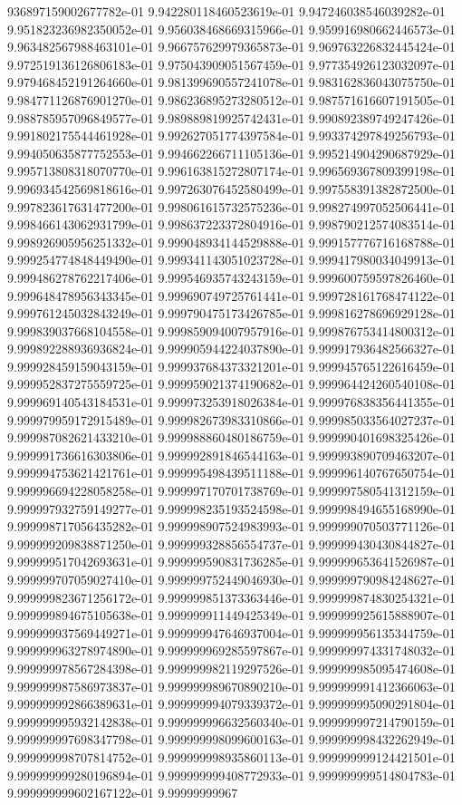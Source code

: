 936897159002677782e-01	9.942280118460523619e-01	9.947246038546039282e-01	9.951823236982350052e-01	9.956038468669315966e-01	9.959916980662446573e-01	9.963482567988463101e-01	9.966757629979365873e-01	9.969763226832445424e-01	9.972519136126806183e-01	9.975043909051567459e-01	9.977354926123032097e-01	9.979468452191264660e-01	9.981399690557241078e-01	9.983162836043075750e-01	9.984771126876901270e-01	9.986236895273280512e-01	9.987571616607191505e-01	9.988785957096849577e-01	9.989889819925742431e-01	9.990892389749247426e-01	9.991802175544461928e-01	9.992627051774397584e-01	9.993374297849256793e-01	9.994050635877752553e-01	9.994662266711105136e-01	9.995214904290687929e-01	9.995713808318070770e-01	9.996163815272807174e-01	9.996569367809399198e-01	9.996934542569818616e-01	9.997263076452580499e-01	9.997558391382872500e-01	9.997823617631477200e-01	9.998061615732575236e-01	9.998274997052506441e-01	9.998466143062931799e-01	9.998637223372804916e-01	9.998790212574083514e-01	9.998926905956251332e-01	9.999048934144529888e-01	9.999157776716168788e-01	9.999254774848449490e-01	9.999341143051023728e-01	9.999417980034049913e-01	9.999486278762217406e-01	9.999546935743243159e-01	9.999600759597826460e-01	9.999648478956343345e-01	9.999690749725761441e-01	9.999728161768474122e-01	9.999761245032843249e-01	9.999790475173426785e-01	9.999816278696929128e-01	9.999839037668104558e-01	9.999859094007957916e-01	9.999876753414800312e-01	9.999892288936936824e-01	9.999905944224037890e-01	9.999917936482566327e-01	9.999928459159043159e-01	9.999937684373321201e-01	9.999945765122616459e-01	9.999952837275559725e-01	9.999959021374190682e-01	9.999964424260540108e-01	9.999969140543184531e-01	9.999973253918026384e-01	9.999976838356441355e-01	9.999979959172915489e-01	9.999982673983310866e-01	9.999985033564027237e-01	9.999987082621433210e-01	9.999988860480186759e-01	9.999990401698325426e-01	9.999991736616303806e-01	9.999992891846544163e-01	9.999993890709463207e-01	9.999994753621421761e-01	9.999995498439511188e-01	9.999996140767650754e-01	9.999996694228058258e-01	9.999997170701738769e-01	9.999997580541312159e-01	9.999997932759149277e-01	9.999998235193524598e-01	9.999998494655168990e-01	9.999998717056435282e-01	9.999998907524983993e-01	9.999999070503771126e-01	9.999999209838871250e-01	9.999999328856554737e-01	9.999999430430844827e-01	9.999999517042693631e-01	9.999999590831736285e-01	9.999999653641526987e-01	9.999999707059027410e-01	9.999999752449046930e-01	9.999999790984248627e-01	9.999999823671256172e-01	9.999999851373363446e-01	9.999999874830254321e-01	9.999999894675105638e-01	9.999999911449425349e-01	9.999999925615888907e-01	9.999999937569449271e-01	9.999999947646937004e-01	9.999999956135344759e-01	9.999999963278974890e-01	9.999999969285597867e-01	9.999999974331748032e-01	9.999999978567284398e-01	9.999999982119297526e-01	9.999999985095474608e-01	9.999999987586973837e-01	9.999999989670890210e-01	9.999999991412366063e-01	9.999999992866389631e-01	9.999999994079339372e-01	9.999999995090291804e-01	9.999999995932142838e-01	9.999999996632560340e-01	9.999999997214790159e-01	9.999999997698347798e-01	9.999999998099600163e-01	9.999999998432262949e-01	9.999999998707814752e-01	9.999999998935860113e-01	9.999999999124421501e-01	9.999999999280196894e-01	9.999999999408772933e-01	9.999999999514804783e-01	9.999999999602167122e-01	9.99999999967
